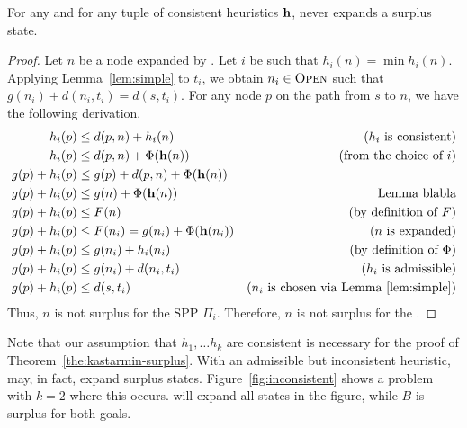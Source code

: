 
\begin{theorem}
  \label{the:kastarmin-surplus}
  For any \kgs and for any tuple of consistent heuristics $\mathbf{h}$, \kastarmin never expands a surplus state.
\end{theorem}
\begin{proof}
  Let $n$ be a node expanded by \kastarmin.
  Let $i$ be such that $h_i(n) = \min h_i(n)$.
  Applying Lemma~\ref{lem:simple} to $t_i$, we obtain $n_i \in \textsc{Open}$ such that $g(n_i) + d(n_i, t_i) = d(s, t_i)$.
  For any node $p$ on the path from $s$ to $n$, we have the following derivation.
  \begin{align}
    h_i(p)        & \leq d(p, n) + h_i(n)         & \text{($h_i$ is consistent)}\\
    h_i(p)        & \leq d(p, n) + \Phi(\mathbf{h}(n))         & \text{(from the choice of $i$)}\\
    g(p) + h_i(p) & \leq g(p) + d(p, n) + \Phi(\mathbf{h}(n)) & \text{}\\
    g(p) + h_i(p) & \leq g(n) + \Phi(\mathbf{h}(n))          & \text{Lemma blabla}\\
    g(p) + h_i(p) & \leq F(n)         & \text{(by definition of $F$)}\\
    g(p) + h_i(p) & \leq F(n_i) = g(n_i) + \Phi(\mathbf{h}(n_i))      & \text{($n$ is expanded)}\\
    g(p) + h_i(p) & \leq g(n_i) + h_i(n_i) & \text{(by definition of $\Phi$)}\\
    g(p) + h_i(p) & \leq g(n_i) + d(n_i, t_i) & \text{($h_i$ is admissible)}\\
    g(p) + h_i(p) & \leq d(s, t_i) & \text{($n_i$ is chosen via Lemma~\ref{lem:simple})}
    \label{eq:nosurplus}
  \end{align}
  Thus, $n$ is not surplus for the SPP $\Pi_i$.
  Therefore, $n$ is not surplus for the \kgs.
\end{proof}

Note that our assumption that $h_1, \ldots h_k$ are consistent is necessary for the proof of Theorem~\ref{the:kastarmin-surplus}.
With an admissible but inconsistent heuristic, \kastarmin may, in fact, expand surplus states.
Figure~\ref{fig:inconsistent} shows a \kgs problem with $k = 2$ where this occurs.
\kastarmin will expand all states in the figure, while $B$ is surplus for both goals.

